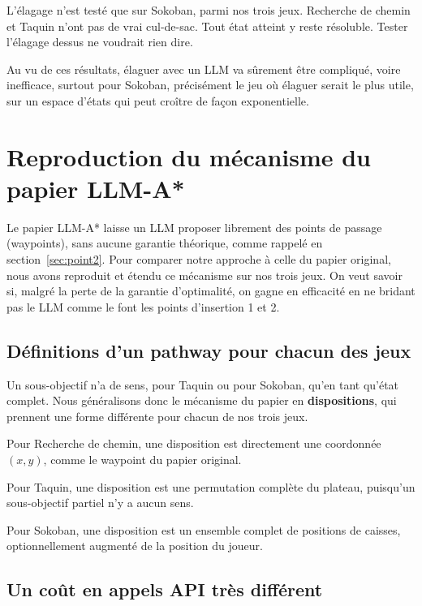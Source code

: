 \documentclass[11pt,a4paper]{article}
\begin{document}
L'élagage n'est testé que sur Sokoban, parmi nos trois jeux.
Recherche de chemin et Taquin n'ont pas de vrai cul-de-sac. Tout état atteint y reste résoluble. Tester l'élagage dessus ne voudrait rien dire.

Au vu de ces résultats, élaguer avec un LLM va sûrement être compliqué,
voire inefficace, surtout pour Sokoban, précisément le jeu où élaguer
serait le plus utile, sur un espace d'états qui peut croître de façon
exponentielle.


\section{Reproduction du mécanisme du papier LLM-A*}
\label{sec:waypoints}

Le papier LLM-A* laisse un LLM proposer librement des points de passage (waypoints), sans aucune garantie théorique, comme rappelé en section~\ref{sec:point2}. Pour comparer notre
approche à celle du papier original, nous avons reproduit et étendu ce mécanisme sur nos trois jeux. On veut savoir si, malgré la perte de la garantie d'optimalité, on gagne en efficacité en ne bridant pas le LLM comme le font les points d'insertion 1 et 2.

\subsection{Définitions d'un pathway pour chacun des jeux}

Un sous-objectif n'a de sens, pour Taquin ou pour Sokoban, qu'en tant qu'état complet. Nous généralisons donc le mécanisme du papier en \textbf{dispositions}, qui prennent une forme différente pour chacun de nos trois jeux.

\smallskip
\noindent
Pour Recherche de chemin, une disposition est directement une coordonnée $(x,y)$, comme le waypoint du papier original.

\smallskip
\noindent
Pour Taquin, une disposition est une permutation complète du plateau, puisqu'un sous-objectif partiel n'y a aucun sens.

\smallskip
\noindent
Pour Sokoban, une disposition est un ensemble complet de positions de caisses, optionnellement augmenté de la position du joueur.

\subsection{Un coût en appels API très différent}
\end{document}
